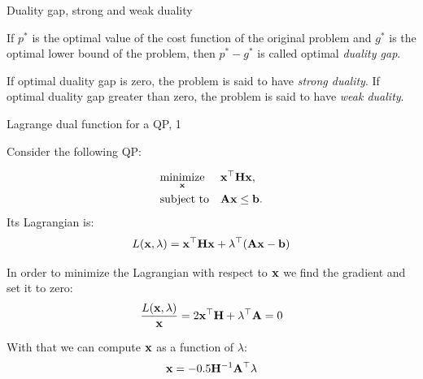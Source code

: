 \documentclass{beamer}
\begin{document}
\begin{frame}{Duality gap, strong and weak duality}
	\begin{flushleft}
		
		If $p^*$ is the optimal value of the cost function of the original problem and $g^*$ is the optimal lower bound of the problem, then $p^* - g^*$ is called optimal \emph{duality gap}.
		
		\bigskip
		
		If optimal duality gap is zero, the problem is said to have \emph{strong duality}. If optimal duality gap greater than zero, the problem is said to have \emph{weak duality}.
		
	\end{flushleft}
\end{frame}



\begin{frame}{Lagrange dual function for a QP, 1}
	\begin{flushleft}
		
		Consider the following QP:
		
		\begin{equation}
			\begin{aligned}
				& \underset{\mathbf{x}}{\text{minimize}}
				& & \mathbf{x}^\top \mathbf{H} \mathbf{x}, \\
				& \text{subject to}
				& & \mathbf{A}\mathbf{x} \leq \mathbf{b}.
			\end{aligned}
		\end{equation}
		Its Lagrangian is:
		\begin{equation}
			L(\mathbf{x}, \lambda) = \mathbf{x}^\top \mathbf{H} \mathbf{x} + \lambda^\top (\mathbf{A}\mathbf{x} - \mathbf{b})
		\end{equation}
		
		In order to minimize the Lagrangian with respect to $\mathbf{x}$ we find the gradient and set it to zero:
		\begin{equation}
			\frac{L(\mathbf{x}, \lambda)}{\mathbf{x}} = 2\mathbf{x}^\top \mathbf{H} + \lambda^\top \mathbf{A} = 0
		\end{equation}
		
		With that we can compute $\mathbf{x}$ as a function of $\lambda$:
		\begin{equation}
			\mathbf{x} = -0.5\mathbf{H}^{-1}\mathbf{A}^\top \lambda
		\end{equation}
		
	\end{flushleft}
\end{frame}
\end{document}
